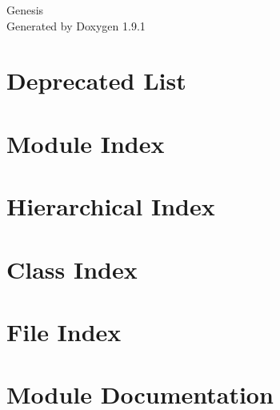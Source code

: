 \let\mypdfximage\pdfximage\def\pdfximage{\immediate\mypdfximage}\documentclass[twoside]{book}
\newcommand{\+}{\discretionary{\mbox{\scriptsize$\hookleftarrow$}}{}{}}
\newcommand{\clearemptydoublepage}{%
  \newpage{\pagestyle{empty}\cleardoublepage}%
}
\begin{document}
\raggedbottom

\hypersetup{pageanchor=false,
             bookmarksnumbered=true,
             pdfencoding=unicode
            }
\begin{titlepage}
\vspace*{7cm}
\begin{center}%
{\Large Genesis }\\
\vspace*{1cm}
{\large Generated by Doxygen 1.9.1}\\
\end{center}
\end{titlepage}
\clearemptydoublepage
{}
\tableofcontents
\clearemptydoublepage
{}
\hypersetup{pageanchor=true}

\chapter{Deprecated List}
\label{deprecated}

\chapter{Module Index}

\chapter{Hierarchical Index}

\chapter{Class Index}

\chapter{File Index}

\chapter{Module Documentation}















\end{document}
